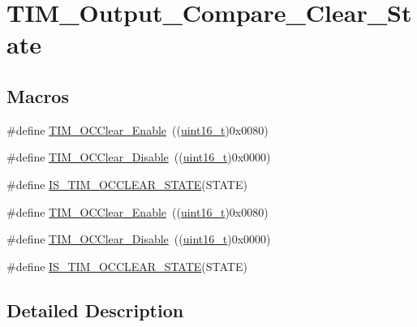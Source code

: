 \hypertarget{group___t_i_m___output___compare___clear___state}{}\section{T\+I\+M\+\_\+\+Output\+\_\+\+Compare\+\_\+\+Clear\+\_\+\+State}
\label{group___t_i_m___output___compare___clear___state}
\subsection*{Macros}
\begin{DoxyCompactItemize}
\item 
\#define \hyperlink{group___t_i_m___output___compare___clear___state_ga1b7bce48b3e1478aad98c95fbbe7a6e0}{T\+I\+M\+\_\+\+O\+C\+Clear\+\_\+\+Enable}~((\hyperlink{_p_e___types_8h_a1f1825b69244eb3ad2c7165ddc99c956}{uint16\+\_\+t})0x0080)
\item 
\#define \hyperlink{group___t_i_m___output___compare___clear___state_gadb09946cb5dded7520baf4b19173204d}{T\+I\+M\+\_\+\+O\+C\+Clear\+\_\+\+Disable}~((\hyperlink{_p_e___types_8h_a1f1825b69244eb3ad2c7165ddc99c956}{uint16\+\_\+t})0x0000)
\item 
\#define \hyperlink{group___t_i_m___output___compare___clear___state_ga5297586b42da9263ac4f767c83202fed}{I\+S\+\_\+\+T\+I\+M\+\_\+\+O\+C\+C\+L\+E\+A\+R\+\_\+\+S\+T\+A\+TE}(S\+T\+A\+TE)
\item 
\#define \hyperlink{group___t_i_m___output___compare___clear___state_ga1b7bce48b3e1478aad98c95fbbe7a6e0}{T\+I\+M\+\_\+\+O\+C\+Clear\+\_\+\+Enable}~((\hyperlink{_p_e___types_8h_a1f1825b69244eb3ad2c7165ddc99c956}{uint16\+\_\+t})0x0080)
\item 
\#define \hyperlink{group___t_i_m___output___compare___clear___state_gadb09946cb5dded7520baf4b19173204d}{T\+I\+M\+\_\+\+O\+C\+Clear\+\_\+\+Disable}~((\hyperlink{_p_e___types_8h_a1f1825b69244eb3ad2c7165ddc99c956}{uint16\+\_\+t})0x0000)
\item 
\#define \hyperlink{group___t_i_m___output___compare___clear___state_ga5297586b42da9263ac4f767c83202fed}{I\+S\+\_\+\+T\+I\+M\+\_\+\+O\+C\+C\+L\+E\+A\+R\+\_\+\+S\+T\+A\+TE}(S\+T\+A\+TE)
\end{DoxyCompactItemize}


\subsection{Detailed Description}


